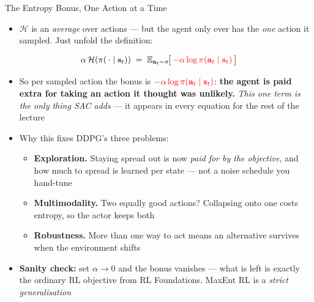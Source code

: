\begin{frame}{The Entropy Bonus, One Action at a Time}
\footnotesize
\begin{itemize}
    \item $\mathcal{H}$ is an \emph{average} over actions --- but the agent only ever has the \emph{one} action it sampled. Just unfold the definition:
\end{itemize}
\vspace{-0.3em}
\[
\alpha\,\mathcal{H}(\pi(\,\cdot\mid \mathbf{s}_t)) \;=\; \mathbb{E}_{\mathbf{a}_t \sim \pi}\!\big[\, \textcolor{red}{-\alpha \log \pi(\mathbf{a}_t \mid \mathbf{s}_t)} \,\big]
\]
\begin{itemize}
    \item So per sampled action the bonus is $\textcolor{red}{-\alpha\log\pi(\mathbf{a}_t\mid\mathbf{s}_t)}$: \textbf{the agent is paid extra for taking an action it thought was unlikely.} \emph{This one term is the only thing SAC adds} --- it appears in every equation for the rest of the lecture
    \vspace{0.3em}
    \item Why this fixes DDPG's three problems:
    \begin{itemize}
        \item \textbf{Exploration.} Staying spread out is now \emph{paid for by the objective}, and how much to spread is learned per state --- not a noise schedule you hand-tune
        \item \textbf{Multimodality.} Two equally good actions? Collapsing onto one costs entropy, so the actor keeps both
        \item \textbf{Robustness.} More than one way to act means an alternative survives when the environment shifts
    \end{itemize}
    \vspace{0.3em}
    \item \textbf{Sanity check:} set $\alpha \to 0$ and the bonus vanishes --- what is left is exactly the ordinary RL objective from RL Foundations. MaxEnt RL is a \emph{strict generalisation}
\end{itemize}
\end{frame}


